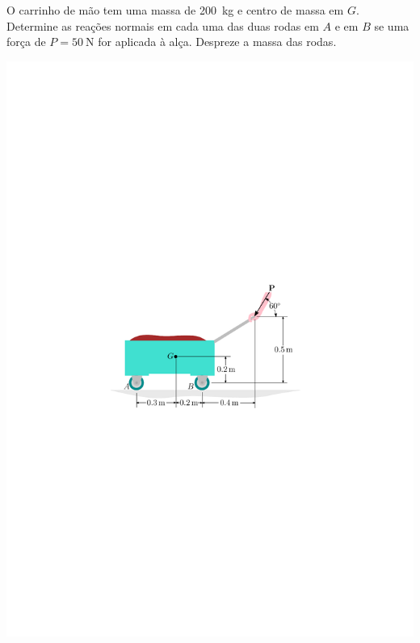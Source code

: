 \item O carrinho de mão tem uma massa de \SI{200}{\kilogram} e centro de massa em $G$. Determine as reações normais em cada uma das duas rodas em $A$ e em $B$ se uma força de $P=\SI{50}{\newton}$ for aplicada à alça. Despreze a massa das rodas.

\vspace{-.7cm}
\begin{flushright}
	\includegraphics[scale=1.1]{../../images/draw_6}
\end{flushright}
